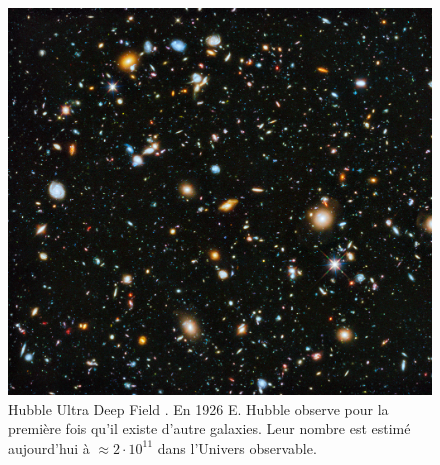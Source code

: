 
\begin{figure}
        \includegraphics[width=.9\linewidth]{img/01/hudf.jpeg} 
        \caption[Hubble Ultra Deep Field]{Hubble Ultra Deep Field \citep{1538-3881-132-5-1729}.
		En 1926 E. Hubble observe pour la première fois qu'il existe d'autre galaxies.
		Leur nombre est estimé aujourd'hui à $\approx 2 \cdot 10^{11}$ dans l'Univers observable.
 		\label{fig:hubbl_deep_field}}
\end{figure}

